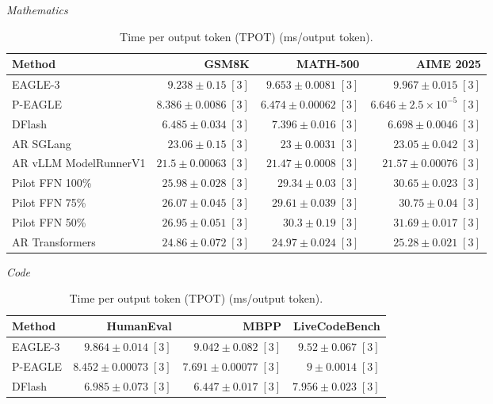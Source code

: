 \begin{table}[!htp]
\centering\small
\setlength{\tabcolsep}{3pt}
\caption{Time per output token (TPOT) (ms/output token).}
\label{tab:appendix-metric-tpot-none}
\textit{Mathematics}\par\smallskip
\begin{tabular}{@{}>{\raggedright\arraybackslash}p{3.7cm}rrr@{}}
\toprule
Method & GSM8K & MATH-500 & AIME 2025 \\
\midrule
EAGLE-3 & \(9.238 \pm 0.15\;[3]\) & \(9.653 \pm 0.0081\;[3]\) & \(9.967 \pm 0.015\;[3]\) \\
P-EAGLE & \(8.386 \pm 0.0086\;[3]\) & \(\mathbf{6.474} \pm 0.00062\;[3]\) & \(\mathbf{6.646} \pm 2.5\times 10^{-5}\;[3]\) \\
DFlash & \(\mathbf{6.485} \pm 0.034\;[3]\) & \(7.396 \pm 0.016\;[3]\) & \(6.698 \pm 0.0046\;[3]\) \\
AR \textperiodcentered{} SGLang & \(23.06 \pm 0.15\;[3]\) & \(23 \pm 0.0031\;[3]\) & \(23.05 \pm 0.042\;[3]\) \\
AR \textperiodcentered{} vLLM ModelRunnerV1 & \(21.5 \pm 0.00063\;[3]\) & \(21.47 \pm 0.0008\;[3]\) & \(21.57 \pm 0.00076\;[3]\) \\
Pilot FFN 100\% & \(25.98 \pm 0.028\;[3]\) & \(29.34 \pm 0.03\;[3]\) & \(30.65 \pm 0.023\;[3]\) \\
Pilot FFN 75\% & \(26.07 \pm 0.045\;[3]\) & \(29.61 \pm 0.039\;[3]\) & \(30.75 \pm 0.04\;[3]\) \\
Pilot FFN 50\% & \(26.95 \pm 0.051\;[3]\) & \(30.3 \pm 0.19\;[3]\) & \(31.69 \pm 0.017\;[3]\) \\
AR \textperiodcentered{} Transformers & \(24.86 \pm 0.072\;[3]\) & \(24.97 \pm 0.024\;[3]\) & \(25.28 \pm 0.021\;[3]\) \\
\bottomrule
\end{tabular}\par\medskip
\textit{Code}\par\smallskip
\begin{tabular}{@{}>{\raggedright\arraybackslash}p{3.7cm}rrr@{}}
\toprule
Method & HumanEval & MBPP & LiveCodeBench \\
\midrule
EAGLE-3 & \(9.864 \pm 0.014\;[3]\) & \(9.042 \pm 0.082\;[3]\) & \(9.52 \pm 0.067\;[3]\) \\
P-EAGLE & \(8.452 \pm 0.00073\;[3]\) & \(7.691 \pm 0.00077\;[3]\) & \(9 \pm 0.0014\;[3]\) \\
DFlash & \(\mathbf{6.985} \pm 0.073\;[3]\) & \(\mathbf{6.447} \pm 0.017\;[3]\) & \(\mathbf{7.956} \pm 0.023\;[3]\) \\

\end{tabular}
\end{table}
